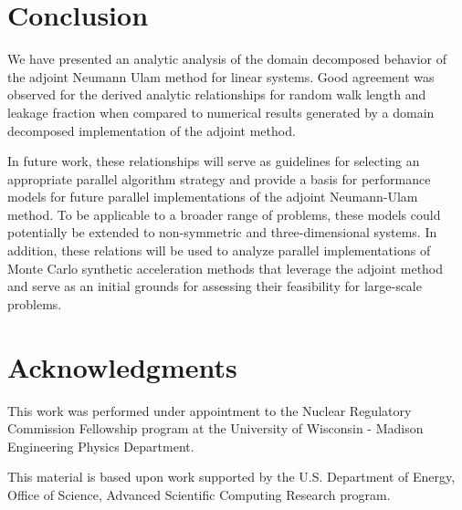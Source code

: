 \documentclass[preprint,11pt]{elsarticle}
\begin{document}
\section{Conclusion}

We have presented an analytic analysis of the domain decomposed
behavior of the adjoint Neumann Ulam method for linear systems. Good
agreement was observed for the derived analytic relationships for
random walk length and leakage fraction when compared to numerical
results generated by a domain decomposed implementation of the adjoint
method.

In future work, these relationships will serve as guidelines for selecting an
appropriate parallel algorithm strategy and provide a basis for performance
models for future parallel implementations of the adjoint Neumann-Ulam
method. To be applicable to a broader range of problems, these models could
potentially be extended to non-symmetric and three-dimensional systems. In
addition, these relations will be used to analyze parallel implementations of
Monte Carlo synthetic acceleration methods that leverage the adjoint method
and serve as an initial grounds for assessing their feasibility for
large-scale problems.

\section{Acknowledgments}
This work was performed under appointment to the Nuclear Regulatory
Commission Fellowship program at the University of Wisconsin - Madison
Engineering Physics Department.

This material is based upon work supported by the U.S. Department of
Energy, Office of Science, Advanced Scientific Computing Research
program.

 
\end{document}
